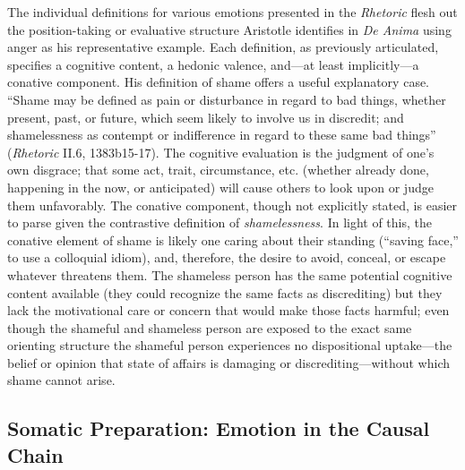 \documentclass{article}
\begin{document}
The individual definitions for various emotions presented in the \textit{Rhetoric} flesh out the position-taking or evaluative structure Aristotle identifies in \textit{De Anima} using anger as his representative example. Each definition, as previously articulated, specifies a cognitive content, a hedonic valence, and---at least implicitly---a conative component. His definition of shame offers a useful explanatory case. ``Shame may be defined as pain or disturbance in regard to bad things, whether present, past, or future, which seem likely to involve us in discredit; and shamelessness as contempt or indifference in regard to these same bad things'' (\textit{Rhetoric} II.6, 1383b15-17). The cognitive evaluation is the judgment of one's own disgrace; that some act, trait, circumstance, etc. (whether already done, happening in the now, or anticipated) will cause others to look upon or judge them unfavorably. The conative component, though not explicitly stated, is easier to parse given the contrastive definition of \textit{shamelessness}. In light of this, the conative element of shame is likely one caring about their standing (``saving face,'' to use a colloquial idiom), and, therefore, the desire to avoid, conceal, or escape whatever threatens them. The shameless person has the same potential cognitive content available (they could recognize the same facts as discrediting) but they lack the motivational care or concern that would make those facts harmful; even though the shameful and shameless person are exposed to the exact same orienting structure the shameful person experiences no dispositional uptake---the belief or opinion that state of affairs is damaging or discrediting---without which shame cannot arise. 

\subsection{Somatic Preparation: Emotion in the Causal Chain}
\end{document}
